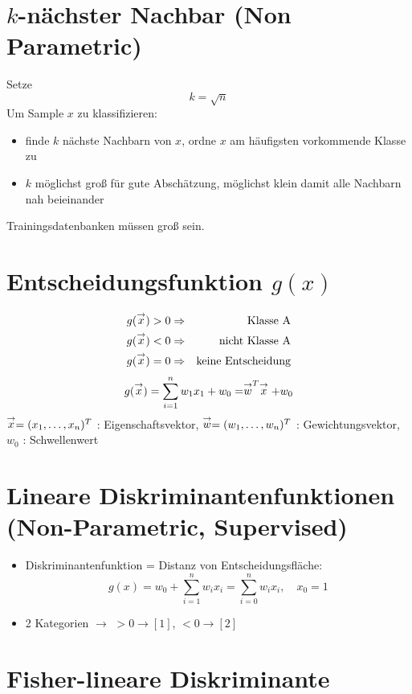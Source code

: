 \section{$k$-nächster Nachbar (Non Parametric)}

Setze $$k = \sqrt{n}$$ Um Sample $x$ zu klassifizieren:
\begin{itemize}
\item finde $k$ nächste Nachbarn von $x$, ordne $x$ am häufigsten vorkommende Klasse zu
\item $k$ möglichst groß für gute Abschätzung, möglichst klein damit alle Nachbarn nah beieinander
\end{itemize}
Trainingsdatenbanken müssen groß sein.

\section{Entscheidungsfunktion $g(x)$}

\begin{eqnarray*}
g(\stackrel{\to}{x}) > 0 &\Rightarrow& \textrm{Klasse A} \\ g(\stackrel{\to}{x}) < 0 &\Rightarrow& \textrm{nicht Klasse A} \\ g(\stackrel{\to}{x}) = 0 &\Rightarrow& \textrm{keine Entscheidung}
\end{eqnarray*}
$$g(\stackrel{\to}{x}) = \sum\limits_{i=1}^n w_1x_1 + w_0 = \stackrel{\to}{w}^T \stackrel{\to}{x} + w_0$$
$\stackrel{\to}{x} = (x_1,\dots,x_n)^T$ : Eigenschaftsvektor, $\stackrel{\to}{w} = (w_1,\dots,w_n)^T$ : Gewichtungsvektor, $w_0$ : Schwellenwert


\section{Lineare Diskriminantenfunktionen (Non-Parametric, Supervised)}

\begin{itemize}
\item Diskriminantenfunktion = Distanz von Entscheidungsfläche: $$g(x) = w_0 + \sum\limits_{i=1}^n w_ix_i = \sum\limits_{i=0}^n w_ix_i, \quad x_0 = 1$$
\item 2 Kategorien $\to$ $>0 \rightarrow [1]$, $<0 \rightarrow [2]$
\end{itemize}

\section{Fisher-lineare Diskriminante}

